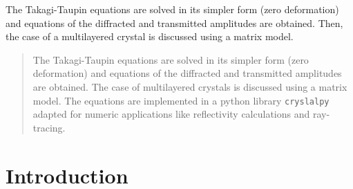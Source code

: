 \documentclass{iucr}
\newcommand{\cyan}[1]{{\color{cyan(process)}#1}}
\begin{document}

\maketitle                        %

\begin{synopsis}
The Takagi-Taupin equations are solved in its simpler form (zero deformation) and equations of the diffracted and transmitted amplitudes are obtained. Then, the case of a multilayered crystal is discussed using a matrix model. 
\end{synopsis}


\begin{abstract}

The Takagi-Taupin equations are solved in its simpler form (zero deformation) and equations of the diffracted and transmitted amplitudes are obtained. \cyan{The case of multilayered crystals is discussed using a matrix model. The equations are implemented in a python library \texttt{cryslalpy} adapted for numeric applications like reflectivity calculations and ray-tracing.} 

\end{abstract}



\section{Introduction}
\label{sec:Intro}
\end{document}
